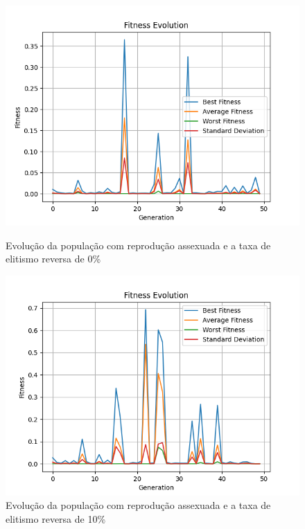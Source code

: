 \documentclass[12pt]{article}
\begin{document}
\begin{figure}[h]
    \centering
    \begin{minipage}{0.5\textwidth}
        \centering
        \includegraphics[width=\linewidth]{figures/assexuado/rev_el_0.png}
        \caption{Evolução da população com reprodução assexuada e a taxa de elitismo reversa de 0\%}
        \label{fig:reverse_elitism_assex_0}
    \end{minipage}\hfill
    \begin{minipage}{0.5\textwidth}
        \centering
        \includegraphics[width=\linewidth]{figures/assexuado/rev_el_10.png}
        \caption{Evolução da população com reprodução assexuada e a taxa de elitismo reversa de 10\%}
        \label{fig:reverse_elitism_assex_10}
    \end{minipage}
\end{figure}
\end{document}

